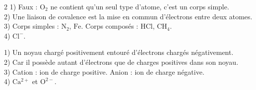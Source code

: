 \begin{multicols}{2}
1) Faux : $\mathrm{O_2}$ ne contient qu'un seul type d'atome, c'est un corps simple.\\
2) Une liaison de covalence est la mise en commun d'électrons entre deux atomes.\\
3) Corps simples : $\mathrm{N_2}$, $\mathrm{Fe}$. Corps composés : $\mathrm{HCl}$,
$\mathrm{CH_4}$.\\
4) $\mathrm{Cl^-}$.

1) Un noyau chargé positivement entouré d'électrons chargés négativement.\\
2) Car il possède autant d'électrons que de charges positives dans son noyau.\\
3) Cation : ion de charge positive. Anion : ion de charge négative.\\
4) $\mathrm{Ca^{2+}}$ et $\mathrm{O^{2-}}$.

\end{multicols}
\exercicesBanner
